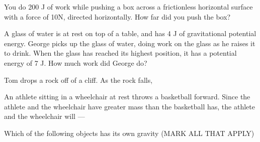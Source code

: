\documentclass[12pt]{examdesign}
\begin{document}
\begin{multiplechoice} [title={Multiple Choice},
	rearrange=no]
\begin{question}
	You do 200 J of work while pushing a box across a frictionless horizontal surface with a force of 10N, directed horizontally.  How far did you push the box?
\end{question}

\begin{question}
	A glass of water is at rest on top of a table, and has 4 J of gravitational potential energy.  George picks up the glass of water, doing work on the glass as he raises it to drink.  When the glass has reached its highest position, it has a potential energy of 7 J.  How much work did George do?
\end{question}

\begin{question}
	Tom drops a rock off of a cliff.  As the rock falls, 
\end{question}



\begin{question}
	An athlete sitting in a wheelchair at rest throws a basketball forward. Since the athlete and the wheelchair have greater mass than the basketball has, the athlete and the wheelchair will — 
\end{question}


\begin{question}
	Which of the following objects has its own gravity (MARK ALL THAT APPLY)

\end{question}



	
	\end{multiplechoice}

	\pagebreak
\end{document}
